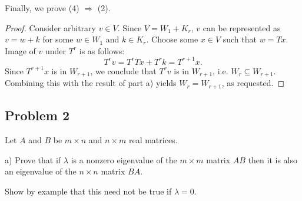 \documentclass{article}
\theoremstyle{definition}
\begin{document}
Finally, we prove (4) $\Longrightarrow$ (2).

\begin{proof}

Consider arbitrary $v \in V$.
Since $V = W_1 + K_r$, $v$ can be represented as $v = w+k$ for some $w \in W_1$ and $k \in K_r$.
Choose some $x \in V$ such that $w = Tx$.
Image of $v$ under $T^r$ is as follows:
\[ T^r v = T^r Tx + T^r k = T^{r+1} x. \]
Since $T^{r+1} x$ is in $W_{r+1}$, we conclude that $T^r v$ is in $W_{r+1}$, i.e. $W_r \subseteq W_{r+1}$.
Combining this with the result of part a) yields $W_r = W_{r+1}$, as requested.

\end{proof}


\subsection*{Problem 2}

\begin{tcolorbox}
Let $A$ and $B$ be $m \times n$ and $n \times m$ real matrices.

a) Prove that if $\lambda$ is a nonzero eigenvalue of the $m \times m$ matrix $AB$ then it is also an eigenvalue of the $n \times n$ matrix $BA$.

Show by example that this need not be true if $\lambda = 0$.
\end{tcolorbox}
\end{document}
